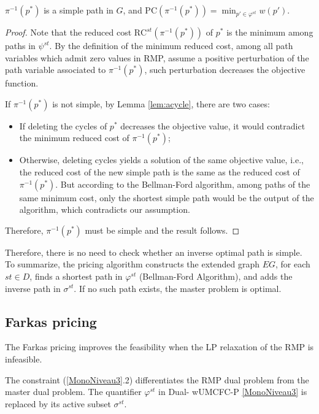 \begin{theorem}
\label{thm:sound}
\(\pi ^{-1}(p^{\ast})\) is a simple  path in  \(G\), and $\textrm{PC}(\pi ^{-1}(p^{\ast})) = \min_{p' \in \varphi^{st}} w(p')$.
\end{theorem}
\begin{proof}


Note that the reduced cost $\textrm{RC}^{st}(\pi ^{-1}(p^{\ast}))$ of $p^{\ast}$ is the minimum among paths in $\psi^{st}$.
By the definition of the minimum reduced cost, among all path variables which admit zero values in RMP, assume a positive perturbation of the path variable associated to \(\pi ^{-1}(p^{\ast})\), such perturbation decreases the objective function.

If  \(\pi ^{-1}(p^{\ast})\) is not simple, by Lemma \eqref{lem:acycle}, there are two cases:
\begin{itemize}
    \item If deleting the cycles of $p^\ast$ decreases the objective value,  it would contradict the minimum reduced cost of  \(\pi ^{-1}(p^{\ast})\);
    \item Otherwise, deleting cycles yields a solution of the same objective value, i.e., the reduced cost of the new simple path is the same as the reduced cost of  \(\pi ^{-1}(p^{\ast})\). But according to the Bellman-Ford algorithm, among paths of the same minimum cost, only the shortest simple path would be the output of the algorithm, which contradicts our assumption.
\end{itemize}
Therefore,  \(\pi ^{-1}(p^{\ast})\)  must be simple and the result follows.
\end{proof}


Therefore, there is no need to check whether an inverse optimal path is simple.
To summarize, the pricing algorithm constructs the extended graph \(EG\), for each \(st \in D\), finds a shortest path in \(\varphi^{st}\) (Bellman-Ford Algorithm), and adds the inverse path in \(\sigma^{st}\). If no such path exists, the master problem is optimal.

\subsection{Farkas pricing}

The Farkas pricing improves the feasibility when the LP relaxation of the RMP is infeasible.

The constraint (\ref{MonoNiveau3}.2) differentiates the RMP dual problem from the master dual problem. The quantifier  \(\varphi^{st}\) in Dual- wUMCFC-P \eqref{MonoNiveau3} is replaced by its active subset \(\sigma^{st}\).

